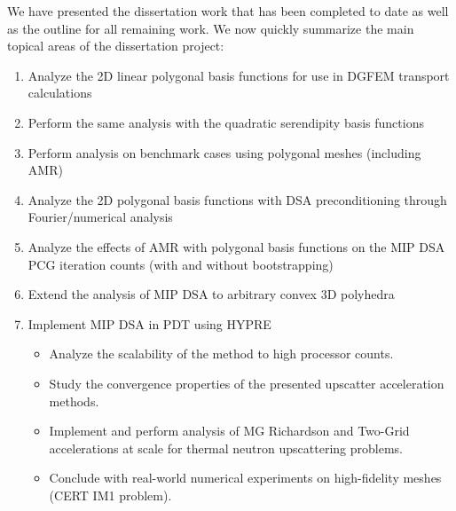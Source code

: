 \documentclass[11pt]{article}
\begin{document}
We have presented the dissertation work that has been completed to date as well as the outline for all remaining work. We now quickly summarize the main topical areas of the dissertation project:

\begin{enumerate}
	\item Analyze the 2D linear polygonal basis functions for use in DGFEM transport calculations
	\item Perform the same analysis with the quadratic serendipity basis functions
	\item Perform analysis on benchmark cases using polygonal meshes (including AMR)
	\item Analyze the 2D polygonal basis functions with DSA preconditioning through Fourier/numerical analysis
	\item Analyze the effects of AMR with polygonal basis functions on the MIP DSA PCG iteration counts (with and without bootstrapping)
	\item Extend the analysis of MIP DSA to arbitrary convex 3D polyhedra
	\item Implement MIP DSA in PDT using HYPRE
	\begin{itemize}
		\item Analyze the scalability of the method to high processor counts.
		\item Study the convergence properties of the presented upscatter acceleration methods.
		\item Implement and perform analysis of MG Richardson and Two-Grid accelerations at scale for thermal neutron upscattering problems.
		\item Conclude with real-world numerical experiments on high-fidelity meshes (CERT IM1 problem).
	\end{itemize}
\end{enumerate}



\end{document}
